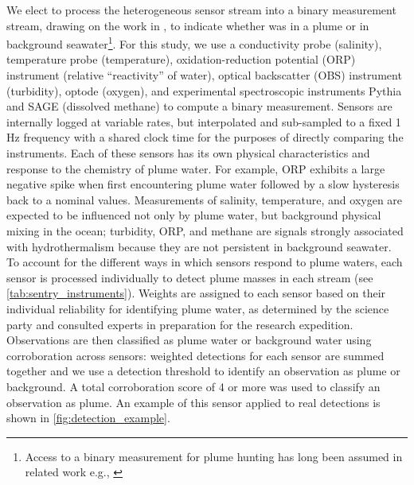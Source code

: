 We elect to process the heterogeneous sensor stream into a binary measurement stream, drawing on the work in \autocite{jakuba2007stochastic}, to indicate whether \Sentry was in a plume or in background seawater\footnote{Access to a binary measurement for plume hunting has long been assumed in related work e.g.,  \autocite{tian2014behavior,saigol2009information}}. For this study,  we use a conductivity probe (salinity), temperature probe (temperature), oxidation-reduction potential (ORP) instrument (relative ``reactivity'' of water), optical backscatter (OBS) instrument (turbidity), optode (oxygen), and experimental spectroscopic instruments Pythia \autocite{michel2022gas,Harb:12} and SAGE \autocite{kapit2021dissolved,kapit2021measurement} (dissolved methane) to compute a binary measurement. Sensors are internally logged at variable rates, but interpolated and sub-sampled to a fixed 1 Hz frequency with a shared clock time for the purposes of directly comparing the instruments. Each of these sensors has its own physical characteristics and response to the chemistry of plume water. For example, ORP exhibits a large negative spike when first encountering plume water followed by a slow hysteresis back to a nominal values. Measurements of salinity, temperature, and oxygen are expected to be influenced not only by plume water, but background physical mixing in the ocean; turbidity, ORP, and methane are signals strongly associated with hydrothermalism because they are not persistent in background seawater. To account for the different ways in which sensors respond to plume waters, each sensor is processed individually to detect plume masses in each stream (see \cref{tab:sentry_instruments}). Weights are assigned to each sensor based on their individual reliability for identifying plume water, as determined by the science party and consulted experts in preparation for the research expedition. Observations are then classified as plume water or background water using corroboration across sensors: weighted detections for each sensor are summed together and we use a detection threshold to identify an observation as plume or background. A total corroboration score of 4 or more was used to classify an observation as plume. An example of this sensor applied to real \Sentry detections is shown in \cref{fig:detection_example}.

